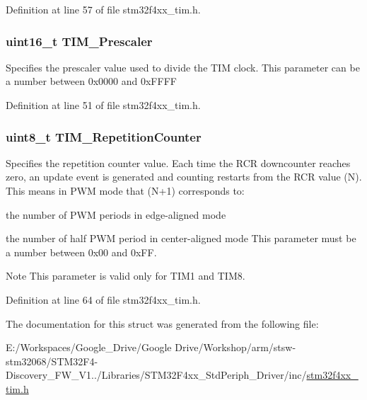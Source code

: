 Definition at line 57 of file stm32f4xx\-\_\-tim.\-h.

\hypertarget{struct_t_i_m___time_base_init_type_def_a30c6857997a4ddd7d3d66fd3a8907c37}{
\subsubsection[{T\-I\-M\-\_\-\-Prescaler}]{\setlength{\rightskip}{0pt plus 5cm}uint16\-\_\-t T\-I\-M\-\_\-\-Prescaler}}\label{struct_t_i_m___time_base_init_type_def_a30c6857997a4ddd7d3d66fd3a8907c37}
Specifies the prescaler value used to divide the T\-I\-M clock. This parameter can be a number between 0x0000 and 0x\-F\-F\-F\-F 

Definition at line 51 of file stm32f4xx\-\_\-tim.\-h.

\hypertarget{struct_t_i_m___time_base_init_type_def_a121b27ced71ccb2c85f1d9825ae8d496}{
\subsubsection[{T\-I\-M\-\_\-\-Repetition\-Counter}]{\setlength{\rightskip}{0pt plus 5cm}uint8\-\_\-t T\-I\-M\-\_\-\-Repetition\-Counter}}\label{struct_t_i_m___time_base_init_type_def_a121b27ced71ccb2c85f1d9825ae8d496}
Specifies the repetition counter value. Each time the R\-C\-R downcounter reaches zero, an update event is generated and counting restarts from the R\-C\-R value (N). This means in P\-W\-M mode that (N+1) corresponds to\-:
\begin{DoxyItemize}
\item the number of P\-W\-M periods in edge-\/aligned mode
\item the number of half P\-W\-M period in center-\/aligned mode This parameter must be a number between 0x00 and 0x\-F\-F. \begin{DoxyNote}{Note}
This parameter is valid only for T\-I\-M1 and T\-I\-M8. 
\end{DoxyNote}

\end{DoxyItemize}

Definition at line 64 of file stm32f4xx\-\_\-tim.\-h.



The documentation for this struct was generated from the following file\-:\begin{DoxyCompactItemize}
\item 
E\-:/\-Workspaces/\-Google\-\_\-\-Drive/\-Google Drive/\-Workshop/arm/stsw-\/stm32068/\-S\-T\-M32\-F4-\/\-Discovery\-\_\-\-F\-W\-\_\-\-V1../\-Libraries/\-S\-T\-M32\-F4xx\-\_\-\-Std\-Periph\-\_\-\-Driver/inc/\hyperlink{stm32f4xx__tim_8h}{stm32f4xx\-\_\-tim.\-h}\end{DoxyCompactItemize}
